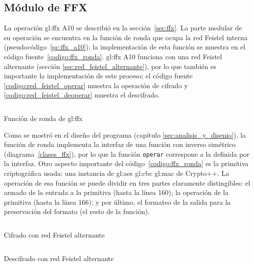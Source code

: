 %
%
%

\subsection{Módulo de FFX}

La operación \gls{gl:ffx} A10 se describió en la sección~\ref{sec:ffx}. La
parte medular de su operación se encuentra en la función de ronda que ocupa
la red Feistel interna (pseudocódigo~\ref{pc:ffx_a10}); la implementación de
esta función se muestra en el código fuente~\ref{codigo:ffx_ronda}.
\gls{gl:ffx} A10 funciona con una red Feistel alternante (sección
\ref{sec:red_feistel_alternante}), por lo que también es importante la
implementación de este proceso; el código fuente
\ref{codigo:red_feistel_operar} muestra la operación de cifrado y
\ref{codigo:red_feistel_deoperar} muestra el descifrado.

\begin{listing}
  \inputminted[firstline=125, lastline=188]
    {c++}{../implementaciones/ffx/cabeceras/ronda_ffx_a10.hh}
  \caption{Función de ronda de \gls{gl:ffx}}
  \label{codigo:ffx_ronda}
\end{listing}

Como se mostró en el diseño del programa (capítulo
\ref{sec:analisis_y_disenio}), la función de ronda implementa la
interfaz de una función con inverso simétrico (diagrama~\ref{clases_ffx}), por
lo que la función \texttt{operar} correspone a la definida por la interfaz.
Otro aspecto importante del código~\ref{codigo:ffx_ronda} es la primitiva
criptográfica usada: una instancia de \gls{gl:aes} \gls{gl:cbc} \gls{gl:mac} de
Crypto++. La operación de esa función se puede dividir en tres partes
claramente distingibles: el armado de la entrada a la primitiva (hasta la línea
160); la operación de la primitiva (hasta la línea 166); y por último, el
formateo de la salida para la preservación del formato (el resto de la función).

\begin{listing}
  \inputminted[firstline=146, lastline=176]
    {c++}{../implementaciones/redes_feistel/cabeceras/red_feistel_alternante.hh}
  \caption{Cifrado con red Feistel alternante}
  \label{codigo:red_feistel_operar}
\end{listing}

\begin{listing}
  \inputminted[firstline=178, lastline=209]
    {c++}{../implementaciones/redes_feistel/cabeceras/red_feistel_alternante.hh}
  \caption{Descifrado con red Feistel alternante}
  \label{codigo:red_feistel_deoperar}
\end{listing}

